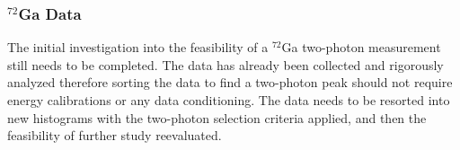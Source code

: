 \documentclass[cnatzke_thesis_proposal.tex]{subfiles}
\begin{document}
\subsubsection{$^{72}$Ga Data}
The initial investigation into the feasibility of a $^{72}$Ga two-photon measurement still needs to be completed. 
The data has already been collected and rigorously analyzed therefore sorting the data to find a two-photon peak should not require energy calibrations or any data conditioning.
The data needs to be resorted into new histograms with the two-photon selection criteria applied, and then the feasibility of further study reevaluated. 

\end{document}

